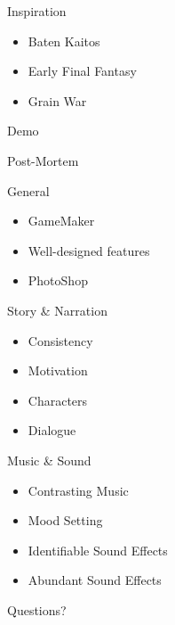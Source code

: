 \documentclass{../teamepsilon}
\begin{document}
\begin{frame}{Inspiration}
    \begin{itemize}
         \item Baten Kaitos
         \item Early Final Fantasy
         \item Grain War
    \end{itemize}
\end{frame}


\begin{frame}[standout]
    \Huge
    Demo
\end{frame}

\begin{frame}[standout]
    \Huge
    Post-Mortem
\end{frame}


\begin{frame}{General}
    \begin{itemize}
        \item GameMaker
        \item Well-designed features
        \item PhotoShop
    \end{itemize}
\end{frame}

\begin{frame}{Story \& Narration}
    \begin{itemize}
        \item Consistency
        \item Motivation
        \item Characters
        \item Dialogue
    \end{itemize}
\end{frame}

\begin{frame}{Music \& Sound}
    \begin{itemize}
        \item Contrasting Music
        \item Mood Setting
        \item Identifiable Sound Effects
        \item Abundant Sound Effects
    \end{itemize}
\end{frame}

\begin{frame}[standout]
    \Huge
    Questions?
\end{frame}
\end{document}
